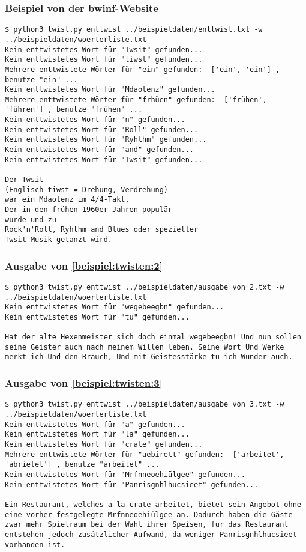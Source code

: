 \documentclass[a4paper,10pt,ngerman]{scrartcl}
\begin{document}
\subsubsection{Beispiel von der bwinf-Website}
\label{beispiel:enttwisten:1}
\begin{lstlisting}[breaklines=true]
$ python3 twist.py enttwist ../beispieldaten/enttwist.txt -w ../beispieldaten/woerterliste.txt
Kein enttwistetes Wort für "Twsit" gefunden...
Kein enttwistetes Wort für "tiwst" gefunden...
Mehrere enttwistete Wörter für "ein" gefunden:  ['ein', 'ein'] , benutze "ein" ...
Kein enttwistetes Wort für "Mdaotenz" gefunden...
Mehrere enttwistete Wörter für "frhüen" gefunden:  ['frühen', 'führen'] , benutze "frühen" ...
Kein enttwistetes Wort für "n" gefunden...
Kein enttwistetes Wort für "Roll" gefunden...
Kein enttwistetes Wort für "Ryhthm" gefunden...
Kein enttwistetes Wort für "and" gefunden...
Kein enttwistetes Wort für "Twsit" gefunden...

Der Twsit  
(Englisch tiwst = Drehung, Verdrehung)  
war ein Mdaotenz im 4/4-Takt,  
Der in den frühen 1960er Jahren populär  
wurde und zu  
Rock'n'Roll, Ryhthm and Blues oder spezieller 
Twsit-Musik getanzt wird.
\end{lstlisting}


\subsubsection{Ausgabe von \ref{beispiel:twisten:2}}
\label{beispiel:enttwisten:2}
\begin{lstlisting}[breaklines=true]
$ python3 twist.py enttwist ../beispieldaten/ausgabe_von_2.txt -w ../beispieldaten/woerterliste.txt
Kein enttwistetes Wort für "wegebeegbn" gefunden...
Kein enttwistetes Wort für "tu" gefunden...

Hat der alte Hexenmeister sich doch einmal wegebeegbn! Und nun sollen seine Geister auch nach meinem Willen leben. Seine Wort Und Werke merkt ich Und den Brauch, Und mit Geistesstärke tu ich Wunder auch.
\end{lstlisting}


\subsubsection{Ausgabe von \ref{beispiel:twisten:3}}
\label{beispiel:enttwisten:3}
\begin{lstlisting}[breaklines=true]
$ python3 twist.py enttwist ../beispieldaten/ausgabe_von_3.txt -w ../beispieldaten/woerterliste.txt
Kein enttwistetes Wort für "a" gefunden...
Kein enttwistetes Wort für "la" gefunden...
Kein enttwistetes Wort für "crate" gefunden...
Mehrere enttwistete Wörter für "aebirett" gefunden:  ['arbeitet', 'abrietet'] , benutze "arbeitet" ...
Kein enttwistetes Wort für "Mrfnneoehiülgee" gefunden...
Kein enttwistetes Wort für "Panrisgnhlhucsieet" gefunden...

Ein Restaurant, welches a la crate arbeitet, bietet sein Angebot ohne eine vorher festgelegte Mrfnneoehiülgee an. Dadurch haben die Gäste zwar mehr Spielraum bei der Wahl ihrer Speisen, für das Restaurant entstehen jedoch zusätzlicher Aufwand, da weniger Panrisgnhlhucsieet vorhanden ist.
\end{lstlisting}
\end{document}
